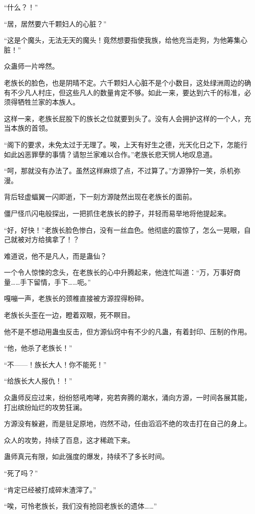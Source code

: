 \begin{this_body}
“什么？！”

“居，居然要六千颗妇人的心脏？”

“这是个魔头，无法无天的魔头！竟然想要指使我族，给他充当走狗，为他筹集心脏！”

众蛊师一片哗然。

老族长的脸色，也是阴晴不定。六千颗妇人心脏不是个小数目，这处绿洲周边的确有不少凡人村庄，但这些凡人的数量肯定不够。如此一来，要达到六千的标准，必须得牺牲兰家的本族人。

这样一来，老族长屁股下的族长之位就要到头了。没有人会拥护这样的一个人，充当本族的首领。

“阁下的要求，未免太过于无理了。唉，上天有好生之德，光天化日之下，怎能行如此凶恶罪孽的事情？请恕兰家难以合作。”老族长悲天悯人地叹息道。

“呵，那就没有办法了。虽然这样麻烦了点，不过算了。”方源狰狞一笑，杀机弥漫。

背后轻虚蝠翼一闪即逝，下一刻方源陡然出现在老族长的面前。

僵尸怪爪闪电般探出，一把抓住老族长的脖子，并轻而易举地将他提起来。

“好，好快！”老族长脸色惨白，没有一丝血色。他彻底的震惊了，怎么一晃眼，自己就被对方给擒拿了！？

难道说，他不是凡人，而是蛊仙？

一个令人惊悚的念头，在老族长的心中升腾起来，他连忙叫道：“万，万事好商量……手下留情，手下……呃。”

嘎嘣一声，老族长的颈椎直接被方源捏得粉碎。

老族长头歪在一边，瞪着双眼，死不瞑目。

他不是不想动用蛊虫反击，但方源仙窍中有不少的凡蛊，有着封印、压制的作用。

“他，他杀了老族长！”

“不——！族长大人！你不能死！”

“给族长大人报仇！！”

众蛊师反应过来，纷纷怒吼咆哮，宛若奔腾的潮水，涌向方源，一时间各展其能，打出缤纷灿烂的攻势狂澜。

方源没有躲避，而是驻足原地，岿然不动，任由滔滔不绝的攻击打在自己的身上。

众人的攻势，持续了百息，这才稀疏下来。

蛊师真元有限，如此强度的爆发，持续不了多长时间。

“死了吗？”

“肯定已经被打成碎末渣滓了。”

“唉，可怜老族长，我们没有抢回老族长的遗体……”


\end{this_body}
